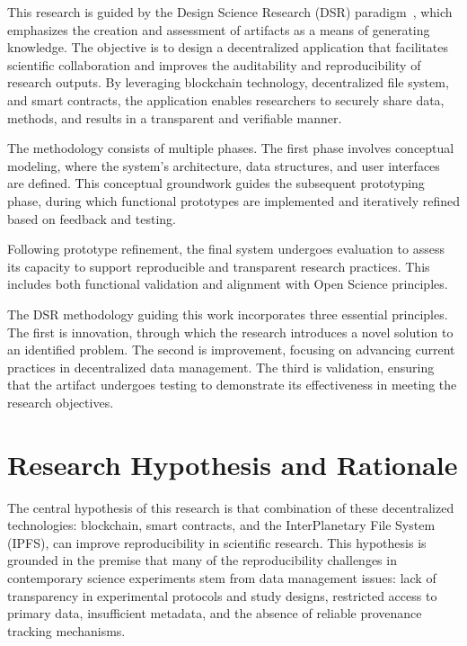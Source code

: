 \documentclass[final]{rc-book-2.14}
\begin{document}
This research is guided by the Design Science Research (DSR) paradigm~\cite{hevner2004design}, which emphasizes the creation and assessment of artifacts as a means of generating knowledge. The objective is to design a decentralized application that facilitates scientific collaboration and improves the auditability and reproducibility of research outputs. By leveraging blockchain technology, decentralized file system, and smart contracts, the application enables researchers to securely share data, methods, and results in a transparent and verifiable manner.

The methodology consists of multiple phases. The first phase involves conceptual modeling, where the system’s architecture, data structures, and user interfaces are defined. This conceptual groundwork guides the subsequent prototyping phase, during which functional prototypes are implemented and iteratively refined based on feedback and testing.

Following prototype refinement, the final system undergoes evaluation to assess its capacity to support reproducible and transparent research practices. This includes both functional validation and alignment with Open Science principles.

The DSR methodology guiding this work incorporates three essential principles. The first is innovation, through which the research introduces a novel solution to an identified problem. The second is improvement, focusing on advancing current practices in decentralized data management. The third is validation, ensuring that the artifact undergoes  testing to demonstrate its effectiveness in meeting the research objectives.


\section{Research Hypothesis and Rationale}
\label{chp:intro:sec:res_hyp}


The central hypothesis of this research is that combination of these decentralized technologies: blockchain, smart contracts, and the InterPlanetary File System (IPFS), can improve reproducibility in scientific research. This hypothesis is grounded in the premise that many of the reproducibility challenges in contemporary science experiments stem from data management issues: lack of transparency in experimental protocols and study designs, restricted access to primary data, insufficient metadata, and the absence of reliable provenance tracking mechanisms.
\end{document}
